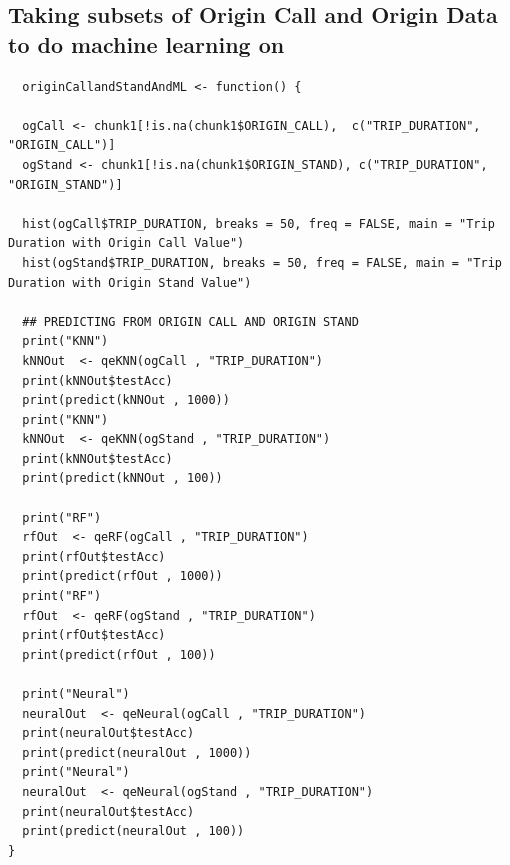 \documentclass{article}
\numberwithin{equation}{section}
\begin{document}
\subsection{Taking subsets of Origin Call and Origin Data to do machine learning on} 
\begin{lstlisting}
  originCallandStandAndML <- function() {
  
  ogCall <- chunk1[!is.na(chunk1$ORIGIN_CALL),  c("TRIP_DURATION", "ORIGIN_CALL")]
  ogStand <- chunk1[!is.na(chunk1$ORIGIN_STAND), c("TRIP_DURATION", "ORIGIN_STAND")]
  
  hist(ogCall$TRIP_DURATION, breaks = 50, freq = FALSE, main = "Trip Duration with Origin Call Value")
  hist(ogStand$TRIP_DURATION, breaks = 50, freq = FALSE, main = "Trip Duration with Origin Stand Value")
  
  ## PREDICTING FROM ORIGIN CALL AND ORIGIN STAND
  print("KNN")
  kNNOut  <- qeKNN(ogCall , "TRIP_DURATION")
  print(kNNOut$testAcc)
  print(predict(kNNOut , 1000))
  print("KNN")
  kNNOut  <- qeKNN(ogStand , "TRIP_DURATION")
  print(kNNOut$testAcc)
  print(predict(kNNOut , 100))
  
  print("RF")
  rfOut  <- qeRF(ogCall , "TRIP_DURATION")
  print(rfOut$testAcc)
  print(predict(rfOut , 1000))
  print("RF")
  rfOut  <- qeRF(ogStand , "TRIP_DURATION")
  print(rfOut$testAcc)
  print(predict(rfOut , 100))
  
  print("Neural")
  neuralOut  <- qeNeural(ogCall , "TRIP_DURATION")
  print(neuralOut$testAcc)
  print(predict(neuralOut , 1000))
  print("Neural")
  neuralOut  <- qeNeural(ogStand , "TRIP_DURATION")
  print(neuralOut$testAcc)
  print(predict(neuralOut , 100))
}
\end{lstlisting}
\end{document}
